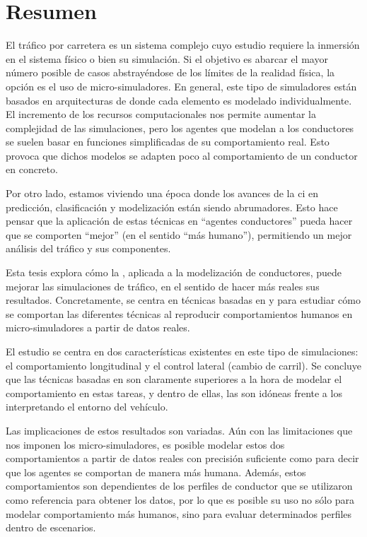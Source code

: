 \cleardoublepage
\thispagestyle{empty}
\chapter*{Resumen}
\begin{fullwidth}
	El tráfico por carretera es un sistema complejo cuyo estudio requiere la inmersión en el sistema físico o bien su simulación. Si el objetivo es abarcar el mayor número posible de casos abstrayéndose de los límites de la realidad física, la opción es el uso de micro-simuladores. En general, este tipo de simuladores están basados en arquitecturas de  donde cada elemento es modelado individualmente. El incremento de los recursos computacionales nos permite aumentar la complejidad de las simulaciones, pero los agentes que modelan a los conductores se suelen basar en funciones simplificadas de su comportamiento real. Esto provoca que dichos modelos se adapten poco al comportamiento de un conductor en concreto.
	
	Por otro lado, estamos viviendo una época donde los avances de la \Acrfull{ci} en predicción, clasificación y modelización están siendo abrumadores. Esto hace pensar que la aplicación de estas técnicas en \enquote{agentes conductores} pueda hacer que se comporten \enquote{mejor} (en el sentido \enquote{más humano}), permitiendo un mejor análisis del tráfico y sus componentes.
	
	Esta tesis explora cómo la , aplicada a la modelización de conductores, puede mejorar las simulaciones de tráfico, en el sentido de hacer más reales sus resultados. Concretamente, se centra en técnicas basadas en  y  para estudiar cómo se comportan las diferentes técnicas al reproducir  comportamientos humanos en micro-simuladores a partir de datos reales.
	
	El estudio se centra en dos características existentes en este tipo de simulaciones: el comportamiento longitudinal y el control lateral (cambio de carril). Se concluye que las técnicas basadas en  son claramente superiores a la hora de modelar el comportamiento en estas tareas, y dentro de ellas, las  son idóneas frente a los  interpretando el entorno del vehículo.
	
	Las implicaciones de estos resultados son variadas. Aún con las limitaciones que nos imponen los micro-simuladores, es posible modelar estos dos comportamientos a partir de datos reales con precisión suficiente como para decir que los agentes se comportan de manera más humana. Además, estos comportamientos son dependientes de los perfiles de conductor que se utilizaron como referencia para obtener los datos, por lo que es posible su uso no sólo para modelar comportamiento más humanos, sino para evaluar determinados perfiles dentro de escenarios.
\end{fullwidth}